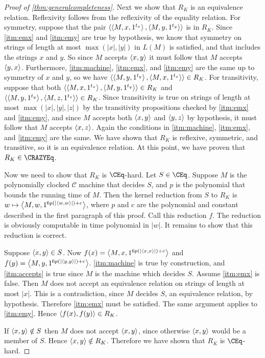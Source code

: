 \begin{proof}[Proof of \autoref{thm:generalcompleteness}]
  Next we show that $R_K$ is an equivalence relation.
  Reflexivity follows from the reflexivity of the equality relation.
  For symmetry, suppose that the pair $\langle\left\langle M,x,1^{t_x}\right\rangle,\left\langle M,y,1^{t_y}\right\rangle\rangle$ is in $R_K$.
  Since \autoref{itm:emx} and \autoref{itm:emy} are true by hypothesis, we know that symmetry on strings of length at most $\max(|x|, |y|)$ in $L(M)$ is satisfied, and that includes the strings $x$ and $y$.
  So since $M$ accepts $\langle x,y\rangle$ it must follow that $M$ accepts $\langle y,x\rangle$.
  Furthermore, \autoref{itm:machine}, \autoref{itm:emx}, and \autoref{itm:emy} are the same up to symmetry of $x$ and $y$, so we have $\langle\left\langle M,y,1^{t_y}\right\rangle,\left\langle M,x,1^{t_x}\right\rangle\rangle\in R_K$.
  For transitivity, suppose that both $\langle\left\langle M,x,1^{t_x}\right\rangle,\left\langle M,y,1^{t_y}\right\rangle\rangle\in R_K$ and $\langle\left\langle M,y,1^{t_y}\right\rangle,\left\langle M,z,1^{t_z}\right\rangle\rangle\in R_K$.
  Since transitivity is true on strings of length at most $\max(|x|, |y|, |z|)$ by the transitivity propositions checked by \autoref{itm:emx} and \autoref{itm:emy}, and since $M$ accepts both $\langle x,y\rangle$ and $\langle y,z\rangle$ by hypothesis, it must follow that $M$ accepts $\langle x,z\rangle$.
  Again the conditions in \autoref{itm:machine}, \autoref{itm:emx}, and \autoref{itm:emy} are the same.
  We have shown that $R_K$ is reflexive, symmetric, and transitive, so it is an equivalence relation.
  At this point, we have proven that $R_K\in\CRAZYEq$.

  Now we need to show that $R_K$ is $\CEq$-hard.
  Let $S\in\CEq$.
  Suppose $M$ is the polynomially clocked $\mathcal{C}$ machine that decides $S$, and $p$ is the polynomial that bounds the running time of $M$.
  Then the kernel reduction from $S$ to $R_K$ is $w\mapsto\left\langle M,w,1^{6p(|\langle w,w\rangle|)+c}\right\rangle$, where $p$ and $c$ are the polynomial and constant described in the first paragraph of this proof.
  Call this reduction $f$.
  The reduction is obviously computable in time polynomial in $|w|$.
  It remains to show that this reduction is correct.

  Suppose $\langle x,y\rangle\in S$.
  Now $f(x)=\left\langle M,x,1^{6p(|\langle x,x\rangle|)+c}\right\rangle$ and $f(y)=\left\langle M,y,1^{6p(|\langle y,y\rangle|)+c}\right\rangle$.
  \autoref{itm:machine} is true by construction, and \autoref{itm:accepts} is true since $M$ is the machine which decides $S$.
  Assume \autoref{itm:emx} is false.
  Then $M$ does not accept an equivalence relation on strings of length at most $|x|$.
  This is a contradiction, since $M$ decides $S$, an equivalence relation, by hypothesis.
  Therefore \autoref{itm:emx} must be satisfied.
  The same argument applies to \autoref{itm:emy}.
  Hence $\langle f(x),f(y)\rangle\in R_K$.

  If $\langle x,y\rangle\notin S$ then $M$ does not accept $\langle x,y\rangle$, since otherwise $\langle x,y\rangle$ would be a member of $S$.
  Hence $\langle x,y\rangle\notin R_K$.
  Therefore we have shown that $R_K$ is $\CEq$-hard.
\end{proof}

